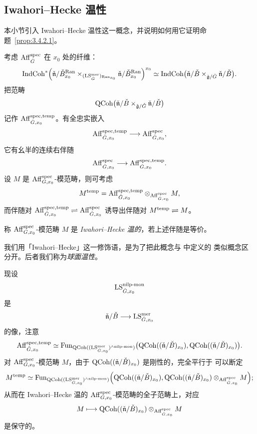 
\subsection{Iwahori–Hecke 温性}
\label{sec:ih-tempered}

本小节引入 Iwahori–Hecke 温性这一概念，并说明如何用它证明命题~\ref{prop:3.4.2.1}。

考虑 $\mathrm{Aff}^{\mathrm{spec}}_{\check G}$ 在 $x_0$ 处的纤维：
\[
\mathrm{IndCoh}^{*}\Bigl(\check{\mathfrak{n}}/\check B^{\mathrm{Ran}}_{x_0}
\times_{(\mathrm{LS}^{\mathrm{mer}}_{\check G})_{\mathrm{Ran}_{x_0}}}
\check{\mathfrak{n}}/\check B^{\mathrm{Ran}}_{x_0}\Bigr)^{x_0}
\simeq \mathrm{IndCoh}\bigl(\check{\mathfrak{n}}/\check B
\times_{\check{\mathfrak{g}}/\check G}\check{\mathfrak{n}}/\check B\bigr).
\]
把范畴
\[
\mathrm{QCoh}\bigl(\check{\mathfrak{n}}/\check B
\times_{\check{\mathfrak{g}}/\check G}\check{\mathfrak{n}}/\check B\bigr)
\]
记作 $\mathrm{Aff}^{\mathrm{spec},\mathrm{temp}}_{\check G,x_0}$。有全忠实嵌入
\[
\mathrm{Aff}^{\mathrm{spec},\mathrm{temp}}_{\check G,x_0}\longrightarrow \mathrm{Aff}^{\mathrm{spec}}_{\check G,x_0},
\]
它有幺半的连续右伴随
\[
\mathrm{Aff}^{\mathrm{spec}}_{\check G,x_0}\longrightarrow \mathrm{Aff}^{\mathrm{spec},\mathrm{temp}}_{\check G,x_0}.
\]
设 $M$ 是 $\mathrm{Aff}^{\mathrm{spec}}_{G,x_0}$-模范畴，则可考虑
\[
M^{\mathrm{temp}}=\mathrm{Aff}^{\mathrm{spec},\mathrm{temp}}_{\check G,x_0}
\otimes_{\mathrm{Aff}^{\mathrm{spec}}_{\check G,x_0}}M,
\]
而伴随对
$\mathrm{Aff}^{\mathrm{spec},\mathrm{temp}}_{\check G,x_0}\rightleftharpoons \mathrm{Aff}^{\mathrm{spec}}_{\check G,x_0}$
诱导出伴随对 $M^{\mathrm{temp}}\rightleftharpoons M$。

\begin{definition}\label{def:ih-tempered}
称 $\mathrm{Aff}^{\mathrm{spec}}_{G,x_0}$-模范畴 $M$ 是 \emph{Iwahori–Hecke 温的}，若上述伴随是等价。
\end{definition}

\begin{remark}\label{rem:ih-tempered}
我们用「Iwahori–Hecke」这一修饰语，是为了把此概念与 \cite[第 7.1 节]{ABC+24a} 中定义的
类似概念区分开。后者我们称为\emph{球面温性}。
\end{remark}

现设
\[
\mathrm{LS}^{\mathrm{nilp\text{-}mon}}_{\check G,x_0}
\]
是
\[
\check{\mathfrak{n}}/\check B\longrightarrow \mathrm{LS}^{\mathrm{mer}}_{\check G,x_0}
\]
的像，注意
\[
\mathrm{Aff}^{\mathrm{spec},\mathrm{temp}}_{\check G,x_0}
\simeq
\operatorname{Fun}_{\mathrm{QCoh}((\mathrm{LS}^{\mathrm{mer}}_{\check G,x_0})^{\wedge\mathrm{nilp\text{-}mon}})}
\bigl(\mathrm{QCoh}((\check{\mathfrak{n}}/\check B)_{x_0}),
\mathrm{QCoh}((\check{\mathfrak{n}}/\check B)_{x_0})\bigr).
\]
对 $\mathrm{Aff}^{\mathrm{spec}}_{G,x_0}$-模范畴 $M$，由于
$\mathrm{QCoh}((\check{\mathfrak{n}}/\check B)_{x_0})$ 是刚性的，完全平行于
\cite[推论 7.1.8]{ABC+24a} 可以断定
\[
M^{\mathrm{temp}}\simeq
\operatorname{Fun}_{\mathrm{QCoh}((\mathrm{LS}^{\mathrm{mer}}_{\check G,x_0})^{\wedge\mathrm{nilp\text{-}mon}})}
\Bigl(\mathrm{QCoh}((\check{\mathfrak{n}}/\check B)_{x_0}),
\mathrm{QCoh}((\check{\mathfrak{n}}/\check B)_{x_0})
\otimes_{\mathrm{Aff}^{\mathrm{spec}}_{\check G,x_0}}M\Bigr);
\]
从而在 Iwahori–Hecke 温的 $\mathrm{Aff}^{\mathrm{spec}}_{G,x_0}$-模范畴的全子范畴上，对应
\[
M\longmapsto \mathrm{QCoh}((\check{\mathfrak{n}}/\check B)_{x_0})
\otimes_{\mathrm{Aff}^{\mathrm{spec}}_{\check G,x_0}}M
\]
是保守的。

